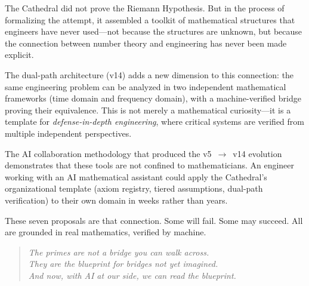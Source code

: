 \documentclass[11pt,a4paper]{article}
\begin{document}
The Cathedral did not prove the Riemann Hypothesis. But in the
process of formalizing the attempt, it assembled a toolkit of
mathematical structures that engineers have never used---not
because the structures are unknown, but because the connection
between number theory and engineering has never been made explicit.

The dual-path architecture (v14) adds a new dimension to this
connection: the same engineering problem can be analyzed in two
independent mathematical frameworks (time domain and frequency
domain), with a machine-verified bridge proving their equivalence.
This is not merely a mathematical curiosity---it is a template for
\emph{defense-in-depth engineering}, where critical systems are
verified from multiple independent perspectives.

The AI collaboration methodology that produced the v5~$\to$~v14
evolution demonstrates that these tools are not confined to
mathematicians. An engineer working with an AI mathematical
assistant could apply the Cathedral's organizational template
(axiom registry, tiered assumptions, dual-path verification) to
their own domain in weeks rather than years.

These seven proposals are that connection. Some will fail. Some may
succeed. All are grounded in real mathematics, verified by machine.

\begin{quote}
\emph{The primes are not a bridge you can walk across.\\
They are the blueprint for bridges not yet imagined.\\
And now, with AI at our side, we can read the blueprint.}
\end{quote}

\vspace{0.5cm}
\end{document}
